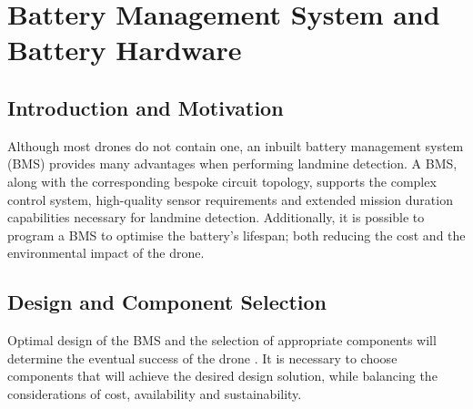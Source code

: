 


\section{Battery Management System and Battery Hardware}
\label{sec:bms}
\subsection{Introduction and Motivation}

Although most drones do not contain one, an inbuilt battery management system (\gls{BMS}) provides many advantages when performing landmine detection. A \acrshort{BMS}, along with the corresponding bespoke circuit topology, supports the complex control system, high-quality sensor requirements and extended mission duration capabilities necessary for landmine detection. Additionally, it is possible to program a \acrshort{BMS} to optimise the battery’s lifespan; both reducing the cost and the environmental impact of the drone.

\subsection{Design and Component Selection}

Optimal design of the \acrshort{BMS} and the selection of appropriate components will determine the eventual success of the drone  \cite{SON2023120186}. It is necessary to choose components that will achieve the desired design solution, while balancing the considerations of cost, availability and sustainability.


